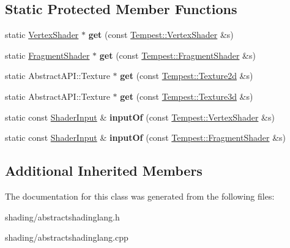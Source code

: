 \subsection*{Static Protected Member Functions}
\begin{DoxyCompactItemize}
\item 
\hypertarget{class_tempest_1_1_abstract_shading_lang_a863f677f069eb0cfed38e66dd1127af0}{static \hyperlink{class_tempest_1_1_vertex_shader}{Vertex\+Shader} $\ast$ {\bfseries get} (const \hyperlink{class_tempest_1_1_vertex_shader}{Tempest\+::\+Vertex\+Shader} \&s)}\label{class_tempest_1_1_abstract_shading_lang_a863f677f069eb0cfed38e66dd1127af0}

\item 
\hypertarget{class_tempest_1_1_abstract_shading_lang_a7bc232ad8cb628968aab014b3db73dd7}{static \hyperlink{class_tempest_1_1_fragment_shader}{Fragment\+Shader} $\ast$ {\bfseries get} (const \hyperlink{class_tempest_1_1_fragment_shader}{Tempest\+::\+Fragment\+Shader} \&s)}\label{class_tempest_1_1_abstract_shading_lang_a7bc232ad8cb628968aab014b3db73dd7}

\item 
\hypertarget{class_tempest_1_1_abstract_shading_lang_af1c414ce2e4027b35ff7003170340437}{static Abstract\+A\+P\+I\+::\+Texture $\ast$ {\bfseries get} (const \hyperlink{class_tempest_1_1_texture2d}{Tempest\+::\+Texture2d} \&s)}\label{class_tempest_1_1_abstract_shading_lang_af1c414ce2e4027b35ff7003170340437}

\item 
\hypertarget{class_tempest_1_1_abstract_shading_lang_ab499ab8fa4032e48fee12c90665ae85f}{static Abstract\+A\+P\+I\+::\+Texture $\ast$ {\bfseries get} (const \hyperlink{class_tempest_1_1_texture3d}{Tempest\+::\+Texture3d} \&s)}\label{class_tempest_1_1_abstract_shading_lang_ab499ab8fa4032e48fee12c90665ae85f}

\item 
\hypertarget{class_tempest_1_1_abstract_shading_lang_ab7d8a834f90091ca36fe7beae9ade0ca}{static const \hyperlink{class_tempest_1_1_shader_input}{Shader\+Input} \& {\bfseries input\+Of} (const \hyperlink{class_tempest_1_1_vertex_shader}{Tempest\+::\+Vertex\+Shader} \&s)}\label{class_tempest_1_1_abstract_shading_lang_ab7d8a834f90091ca36fe7beae9ade0ca}

\item 
\hypertarget{class_tempest_1_1_abstract_shading_lang_a64926d5d4abe19d2cf7d2f1bb72e6fc3}{static const \hyperlink{class_tempest_1_1_shader_input}{Shader\+Input} \& {\bfseries input\+Of} (const \hyperlink{class_tempest_1_1_fragment_shader}{Tempest\+::\+Fragment\+Shader} \&s)}\label{class_tempest_1_1_abstract_shading_lang_a64926d5d4abe19d2cf7d2f1bb72e6fc3}

\end{DoxyCompactItemize}
\subsection*{Additional Inherited Members}


The documentation for this class was generated from the following files\+:\begin{DoxyCompactItemize}
\item 
shading/abstractshadinglang.\+h\item 
shading/abstractshadinglang.\+cpp\end{DoxyCompactItemize}
